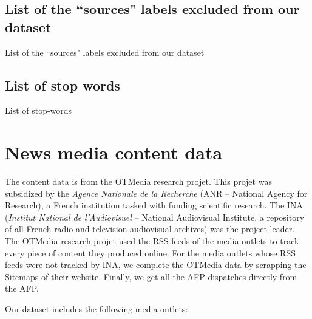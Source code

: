\subsection{List of the ``sources" labels excluded from our dataset} \label{Appendix:Bots}
\begin{table}[H]
    \centering
    \resizebox*{!}{\dimexpr\textheight-1\baselineskip\relax}{
    
    }
    \caption{List of the ``sources" labels excluded from our dataset}
    \label{tab:botlist}
\end{table}


\subsection{List of stop words}
\label{Appendix:StopWords}

\begin{table}[H]
    \centering
    \resizebox*{!}{\dimexpr\textheight-1\baselineskip\relax}{
    
    }
	\caption{List of stop-words}
	\label{tab:stop_words}
\end{table}


\clearpage 
\pagebreak


\section{News media content data\label{Sec:OA_Content}}

The content data is from the OTMedia research projet. This projet was subsidized by the \textit{Agence Nationale de la Recherche} (ANR -- National Agency for Research), a French institution tasked with funding scientific research. The INA (\textit{Institut National de l'Audiovisuel} -- National Audiovisual Institute, a repository of all French radio and television audiovisual archives) was the project leader. The OTMedia research projet used the RSS feeds of the media outlets to track every piece of content they produced online. For the media outlets whose RSS feeds were not tracked by INA, we complete the OTMedia data by scrapping the Sitemaps of their website. Finally, we get all the AFP dispatches directly from the AFP.

Our dataset includes the following media outlets:

